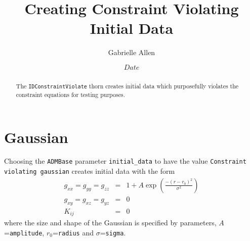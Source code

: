 \documentclass{article}
\begin{document}
\title{Creating Constraint Violating Initial Data}
\author{Gabrielle Allen}
\date{$Date$}

\maketitle


\begin{abstract}
The \texttt{IDConstraintViolate} thorn creates initial data
which purposefully violates the constraint equations for testing purposes.
\end{abstract}


\section{Gaussian}

Choosing the {\tt ADMBase} parameter {\tt initial\_data} to have the 
value {\tt Constraint violating gaussian} creates initial data with the
form
\begin{eqnarray*}
g_{xx} = g_{yy} = g_{zz} &=& 1 + A \exp \left(\frac{-(r-r_0)^2}{\sigma^2}\right)
\\
g_{xy} = g_{xz} = g_{yz} &=& 0
\\
K_{ij} &=& 0
\end{eqnarray*}
where the size and shape of the Gaussian is specified by parameters, $A$={\tt amplitude}, $r_0$={\tt radius} and $\sigma$={\tt sigma}.

\end{document}
